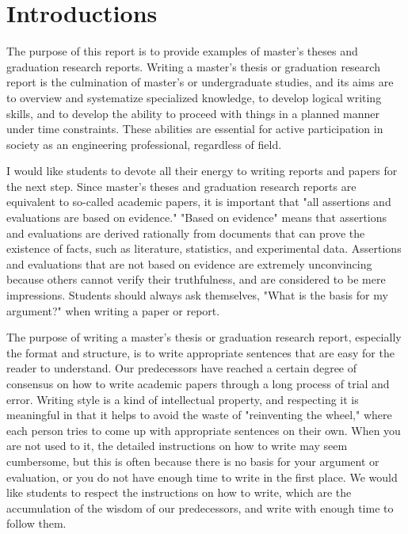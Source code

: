 \begin{contents}
\tableofcontents %
\end{contents}

\chapter{Introductions}
The purpose of this report is to provide examples of master's theses and graduation research reports. Writing a master's thesis or graduation research report is the culmination of master's or undergraduate studies, and its aims are to overview and systematize specialized knowledge, to develop logical writing skills, and to develop the ability to proceed with things in a planned manner under time constraints. These abilities are essential for active participation in society as an engineering professional, regardless of field.

I would like students to devote all their energy to writing reports and papers for the next step. Since master's theses and graduation research reports are equivalent to so-called academic papers, it is important that "all assertions and evaluations are based on evidence." "Based on evidence" means that assertions and evaluations are derived rationally from documents that can prove the existence of facts, such as literature, statistics, and experimental data. Assertions and evaluations that are not based on evidence are extremely unconvincing because others cannot verify their truthfulness, and are considered to be mere impressions. Students should always ask themselves, "What is the basis for my argument?" when writing a paper or report.

The purpose of writing a master's thesis or graduation research report, especially the format and structure, is to write appropriate sentences that are easy for the reader to understand. Our predecessors have reached a certain degree of consensus on how to write academic papers through a long process of trial and error. Writing style is a kind of intellectual property, and respecting it is meaningful in that it helps to avoid the waste of "reinventing the wheel," where each person tries to come up with appropriate sentences on their own. When you are not used to it, the detailed instructions on how to write may seem cumbersome, but this is often because there is no basis for your argument or evaluation, or you do not have enough time to write in the first place. We would like students to respect the instructions on how to write, which are the accumulation of the wisdom of our predecessors, and write with enough time to follow them.

